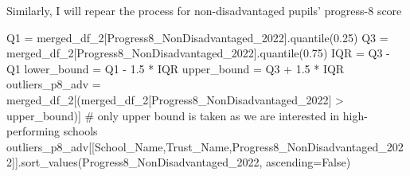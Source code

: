 \documentclass[
  letterpaper,
  DIV=11,
  numbers=noendperiod]{scrartcl}
\newenvironment{Shaded}{\begin{snugshade}}{\end{snugshade}}
\newcommand{\CommentTok}[1]{\textcolor[rgb]{0.37,0.37,0.37}{#1}}
\newcommand{\FloatTok}[1]{\textcolor[rgb]{0.68,0.00,0.00}{#1}}
\newcommand{\NormalTok}[1]{\textcolor[rgb]{0.00,0.23,0.31}{#1}}
\newcommand{\OperatorTok}[1]{\textcolor[rgb]{0.37,0.37,0.37}{#1}}
\newcommand{\StringTok}[1]{\textcolor[rgb]{0.13,0.47,0.30}{#1}}
\newcommand{\VariableTok}[1]{\textcolor[rgb]{0.07,0.07,0.07}{#1}}
\begin{document}
Similarly, I will repear the process for non-disadvantaged pupils'
progress-8 score

\begin{Shaded}
\begin{Highlighting}[]
\NormalTok{Q1 }\OperatorTok{=}\NormalTok{ merged\_df\_2[}\StringTok{\textquotesingle{}Progress8\_NonDisadvantaged\_2022\textquotesingle{}}\NormalTok{].quantile(}\FloatTok{0.25}\NormalTok{)}
\NormalTok{Q3 }\OperatorTok{=}\NormalTok{ merged\_df\_2[}\StringTok{\textquotesingle{}Progress8\_NonDisadvantaged\_2022\textquotesingle{}}\NormalTok{].quantile(}\FloatTok{0.75}\NormalTok{)}
\NormalTok{IQR }\OperatorTok{=}\NormalTok{ Q3 }\OperatorTok{{-}}\NormalTok{ Q1}
\NormalTok{lower\_bound }\OperatorTok{=}\NormalTok{ Q1 }\OperatorTok{{-}} \FloatTok{1.5} \OperatorTok{*}\NormalTok{ IQR}
\NormalTok{upper\_bound }\OperatorTok{=}\NormalTok{ Q3 }\OperatorTok{+} \FloatTok{1.5} \OperatorTok{*}\NormalTok{ IQR}
\NormalTok{outliers\_p8\_adv }\OperatorTok{=}\NormalTok{ merged\_df\_2[(merged\_df\_2[}\StringTok{\textquotesingle{}Progress8\_NonDisadvantaged\_2022\textquotesingle{}}\NormalTok{] }\OperatorTok{\textgreater{}}\NormalTok{ upper\_bound)]  }\CommentTok{\# only upper bound is taken as we are interested in high{-}performing schools}
\NormalTok{outliers\_p8\_adv[[}\StringTok{\textquotesingle{}School\_Name\textquotesingle{}}\NormalTok{,}\StringTok{\textquotesingle{}Trust\_Name\textquotesingle{}}\NormalTok{,}\StringTok{\textquotesingle{}Progress8\_NonDisadvantaged\_2022\textquotesingle{}}\NormalTok{]].sort\_values(}\StringTok{\textquotesingle{}Progress8\_NonDisadvantaged\_2022\textquotesingle{}}\NormalTok{, ascending}\OperatorTok{=}\VariableTok{False}\NormalTok{)}
\end{Highlighting}
\end{Shaded}
\end{document}
